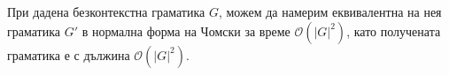 \begin{thm}
  При дадена безконтекстна граматика $G$, можем да намерим еквивалентна
  на нея граматика $G'$ в нормална форма на Чомски за време $\mathcal{O}(|G|^2)$,
  като получената граматика е с дължина $\mathcal{O}(|G|^2)$.
\end{thm}






